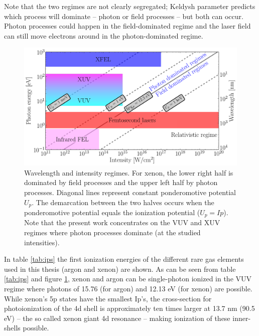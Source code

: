 Note that the two regimes are not clearly segregated; Keldysh parameter
predicts which process will dominate -- photon or field processes --
but both can occur. Photon processes could happen in the field-dominated
regime and the laser field can still move electrons around in the photon-dominated regime.

\begin{figure}
\centering
\includegraphics[width=\figurewidth]{figures/regimes}
\caption{Wavelength and intensity regimes. For xenon, the lower right half is dominated
         by field processes and the upper left half by photon processes. Diagonal
         lines represent constant ponderomotive potential $U_p$. The
         demarcation between the two halves occurs when the ponderomotive
         potential equals the ionization potential ($U_p = Ip$).
         Note that the present work concentrates on the VUV and XUV regimes
         where photon processes dominate (at the studied intensities).}
\label{fig:regimes}
\end{figure}

In table \ref{tab:ips} the first ionization energies of the different
rare gas elements used in this thesis (argon and xenon) are shown. As can be
seen from table \ref{tab:ips} and figure \ref{fig:regimes}, xenon and argon can be
single-photon ionized in the VUV regime where photons of 15.76 (for argon)
and 12.13 eV (for xenon) are possible. While xenon's 5p states have the smallest
Ip's, the cross-section for photoionization of the 4d shell is approximately ten
times larger at 13.7 nm (90.5 eV) -- the so called xenon giant 4d
resonance\cite{Becker1986} -- making ionization of these inner-shells
possible\cite{Thomas2009,Ackad2013}.

